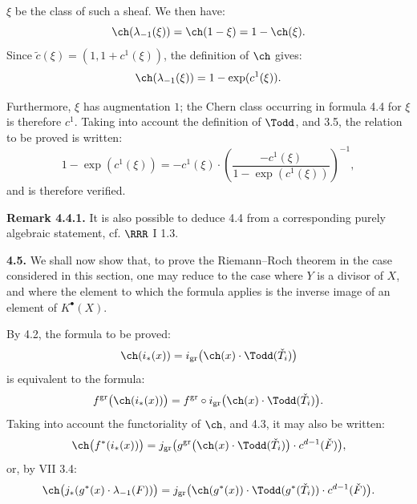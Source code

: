 %
\(\xi\) be the class of such a sheaf. We then have:
\[
 \ch(\lambda_{-1}(\xi))=\ch(1-\xi)=1-\ch(\xi).
\]
Since \(\widetilde c(\xi)=(1,1+c^1(\xi))\), the definition of \(\ch\) gives:
\[
 \ch(\lambda_{-1}(\xi))=1-\exp(c^1(\xi)).
\]

Furthermore, \(\xi\) has augmentation \(1\); the Chern class occurring in formula 4.4 for \(\xi\) is therefore \(c^1\). Taking into account the definition of \(\Todd\), and 3.5, the relation to be proved is written:
\[
 1-\exp(c^1(\xi))
 =
 -c^1(\xi)\cdot\left(\frac{-c^1(\xi)}{1-\exp(c^1(\xi))}\right)^{-1},
\]
and is therefore verified.

\textbf{Remark 4.4.1.} It is also possible to deduce 4.4 from a corresponding purely algebraic statement, cf. \(\RRR\) I 1.3.

\textbf{4.5.} We shall now show that, to prove the Riemann--Roch theorem in the case considered in this section, one may reduce to the case where \(Y\) is a divisor of \(X\), and where the element to which the formula applies is the inverse image of an element of \(K^{\bullet}(X)\).

By 4.2, the formula to be proved:
\[
 \ch(i_*(x))=
 i_{\mathrm{gr}}\bigl(\ch(x)\cdot\Todd(\check T_i)\bigr)
\]
is equivalent to the formula:
\[
 f^{\mathrm{gr}}\bigl(\ch(i_*(x))\bigr)
 =
 f^{\mathrm{gr}}\circ i_{\mathrm{gr}}\bigl(\ch(x)\cdot\Todd(\check T_i)\bigr).
\]
Taking into account the functoriality of \(\ch\), and 4.3, it may also be written:
\[
 \ch\bigl(f^*(i_*(x))\bigr)
 =
 j_{\mathrm{gr}}\bigl(g^{\mathrm{gr}}\bigl(\ch(x)\cdot\Todd(\check T_i)\bigr)\cdot c^{d-1}(\check F)\bigr),
\]
or, by VII 3.4:
\[
 \ch\bigl(j_*(g^*(x)\cdot\lambda_{-1}(F))\bigr)
 =
 j_{\mathrm{gr}}\bigl(\ch(g^*(x))\cdot\Todd(g^*(\check T_i))\cdot c^{d-1}(\check F)\bigr).
\]
